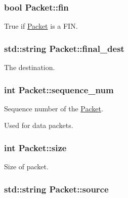\hypertarget{classPacket_a2143fa46561ca6d5f5edd8678602ef6c}{
\subsubsection[{fin}]{\setlength{\rightskip}{0pt plus 5cm}bool {\bf \-Packet\-::fin}}}\label{classPacket_a2143fa46561ca6d5f5edd8678602ef6c}


\-True if \hyperlink{classPacket}{\-Packet} is a \-F\-I\-N. 

\hypertarget{classPacket_a14d18bd9829ec1951730bc8bbadb570d}{
\subsubsection[{final\-\_\-dest}]{\setlength{\rightskip}{0pt plus 5cm}std\-::string {\bf \-Packet\-::final\-\_\-dest}}}\label{classPacket_a14d18bd9829ec1951730bc8bbadb570d}


\-The destination. 

\hypertarget{classPacket_a1dcc152b6caa339c9d6f86c0fcde1c52}{
\subsubsection[{sequence\-\_\-num}]{\setlength{\rightskip}{0pt plus 5cm}int {\bf \-Packet\-::sequence\-\_\-num}}}\label{classPacket_a1dcc152b6caa339c9d6f86c0fcde1c52}


\-Sequence number of the \hyperlink{classPacket}{\-Packet}. 

\-Used for data packets. \hypertarget{classPacket_ad6c10fc808850949cd3f9b9a2ff018d5}{
\subsubsection[{size}]{\setlength{\rightskip}{0pt plus 5cm}int {\bf \-Packet\-::size}}}\label{classPacket_ad6c10fc808850949cd3f9b9a2ff018d5}


\-Size of packet. 

\hypertarget{classPacket_a9fdc30310ed4a548f4a51dc6c79442d9}{
\subsubsection[{source}]{\setlength{\rightskip}{0pt plus 5cm}std\-::string {\bf \-Packet\-::source}}}\label{classPacket_a9fdc30310ed4a548f4a51dc6c79442d9}


